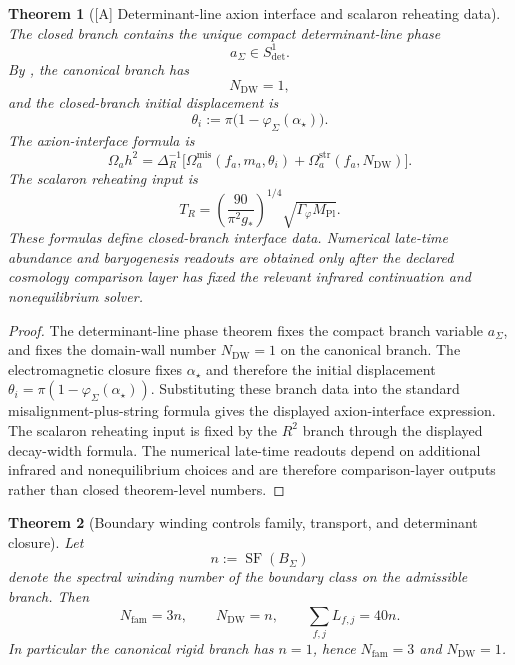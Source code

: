 \documentclass[11pt,a4paper]{article}
\newtheorem{theorem}{Theorem}[section]
\theoremstyle{definition}
\theoremstyle{remark}
\DeclareMathOperator{\SF}{SF}
\newcommand{\Mplunred}{M_{\mathrm{Pl}}}
\newcommand{\phiseam}{\varphi_{\Sigma}}
\begin{document}
\begin{theorem}[\textnormal{[A]} Determinant-line axion interface and scalaron reheating data]
\label{thm:axion-seam-phase}
The closed branch contains the unique compact determinant-line phase
\[
a_\Sigma\in S^1_{\det}.
\]
By , the canonical branch has
\[
N_{\mathrm{DW}}=1,
\]
and the closed-branch initial displacement is
\[
\theta_i:=\pi\bigl(1-\phiseam(\alpha_\star)\bigr).
\]
The axion-interface formula is
\[
\Omega_a h^2=
\Delta_R^{-1}
\bigl[
\Omega_a^{\mathrm{mis}}(f_a,m_a,\theta_i)
+
\Omega_a^{\mathrm{str}}(f_a,N_{\mathrm{DW}})
\bigr].
\]
The scalaron reheating input is
\[
T_R=
\left(\frac{90}{\pi^2 g_\ast}\right)^{1/4}
\sqrt{\Gamma_\varphi \Mplunred}.
\]
These formulas define closed-branch interface data. Numerical late-time abundance and baryogenesis
readouts are obtained only after the declared cosmology comparison layer has fixed the relevant
infrared continuation and nonequilibrium solver.
\end{theorem}

\begin{proof}
The determinant-line phase theorem fixes the compact branch variable $a_\Sigma$, and
 fixes the domain-wall number $N_{\mathrm{DW}}=1$ on the
canonical branch. The electromagnetic closure fixes $\alpha_\star$ and therefore the initial
displacement $\theta_i=\pi(1-\phiseam(\alpha_\star))$. Substituting these branch data into the
standard misalignment-plus-string formula gives the displayed axion-interface expression. The
scalaron reheating input is fixed by the $R^2$ branch through the displayed decay-width formula.
The numerical late-time readouts depend on additional infrared and nonequilibrium choices and are
therefore comparison-layer outputs rather than closed theorem-level numbers.
\end{proof}

\begin{theorem}[Boundary winding controls family, transport, and determinant closure]
\label{thm:boundary-winding-control}
Let
\[
n:=\SF(B_\Sigma)
\]
denote the spectral winding number of the boundary class on the admissible branch. Then
\[
N_{\mathrm{fam}}=3n,
\qquad
N_{\mathrm{DW}}=n,
\qquad
\sum_{f,j}L_{f,j}=40n.
\]
In particular the canonical rigid branch has $n=1$, hence $N_{\mathrm{fam}}=3$ and
$N_{\mathrm{DW}}=1$.
\end{theorem}
\end{document}
